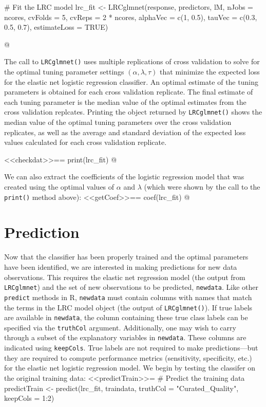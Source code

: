 \documentclass{article}
\begin{document}
# Fit the LRC model
lrc_fit <- LRCglmnet(response, predictors, lM, nJobs = ncores,
                     cvFolds = 5, cvReps = 2 * ncores,
                     alphaVec = c(1, 0.5), tauVec = c(0.3, 0.5, 0.7),
                     estimateLoss = TRUE)

@ 

\noindent The call to {\tt LRCglmnet()} uses multiple replications of cross validation to solve for 
the optimal tuning parameter settings $\left(\alpha, \lambda, \tau\right)$ that minimize the expected loss for 
the elastic net logistic regression 
classifier. An optimal estimate of the tuning parameters is obtained for each cross validation replicate. 
The final estimate of each tuning parameter is the median value of the optimal estimates from the cross validation replcates.
Printing the object returned by {\tt LRCglmnet()} shows the median value of the optimal tuning parameters over the cross validation 
replicates, as well as the average and standard deviation of the expected loss values calculated for each
cross validation replicate.
 
<<checkdat>>==
print(lrc_fit)
@

\noindent We can also extract the coefficients of the logistic regression model that was created using the 
optimal values of $\alpha$ and $\lambda$ (which were shown by the call to the {\tt print()} method above):
<<getCoef>>==
coef(lrc_fit)
@

\section{Prediction}

Now that the classifier has been properly trained and the optimal parameters have been identified, we are 
interested in making predictions for new data observations. This requires the elastic net regression model 
(the output from {\tt LRCglmnet}) and the set of new observations to be predicted, {\tt newdata}.  
Like other {\tt predict} methods in R, {\tt newdata} must contain columns with names that match the terms 
in the LRC model object (the output of {\tt LRCglmnet()}).  If true labels are available in {\tt newdata}, the column containing 
these true class labels can be specified via the 
{\tt truthCol} argument. Additionally, one may wish to carry through a subset of the explanatory variables in 
{\tt newdata}.  These columns are indicated using {\tt keepCols}.   True labels are not required to make 
predictions---but they are required to compute performance metrics (sensitivity, specificity, etc.) for the 
elastic net logistic regression model. We begin by testing the classifer on the original training data:
<<predictTrain>>=
# Predict the training data
predictTrain <- predict(lrc_fit, traindata, truthCol = "Curated_Quality", keepCols = 1:2)
\end{document}
